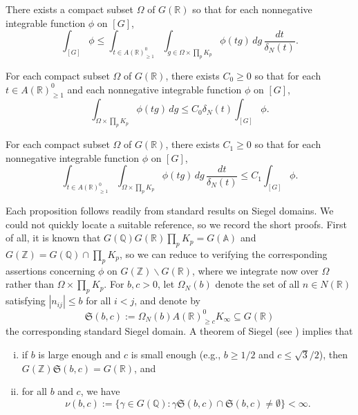 \begin{proposition}\label{prop:siegel-upper}
  There exists a compact subset $\Omega$ of $G(\mathbb{R})$ so that for each nonnegative integrable function $\phi$ on $[G]$,
  \begin{equation*}
    \int_{[G]} \phi \leq \int_{t \in A(\mathbb{R})_{\geq 1}^0} \int_{g \in \Omega \times \prod_p K_p} \phi(t g) \, d g \, \frac{d t}{\delta_N(t)}.
  \end{equation*}
\end{proposition}
\begin{proposition}\label{prop:siegel-lower}
  For each compact subset $\Omega$ of $G(\mathbb{R})$, there exists $C_0 \geq 0$ so that for each $t \in A(\mathbb{R})^0_{\geq 1}$ and each nonnegative integrable function $\phi$ on $[G]$,
  \begin{equation*}
    \int_{\Omega \times \prod_p K_p} \phi(t g) \, d g
    \leq C_0 \delta_N(t) \int_{[G]} \phi.
  \end{equation*}
\end{proposition}
\begin{proposition}\label{prop:siegel-lower-integrated}
  For each compact subset $\Omega$ of $G(\mathbb{R})$, there exists $C_1 \geq 0$ so that for each nonnegative integrable function $\phi$ on $[G]$,
  \begin{equation*}
    \int_{t \in A(\mathbb{R})_{\geq 1}^0} \int_{\Omega \times \prod_p K_p} \phi(t g) \, d g
    \, \frac{d t}{\delta_N(t)}
    \leq C_1 \int_{[G]} \phi.
  \end{equation*}
\end{proposition}
Each proposition follows readily from standard results on Siegel domains.  We could not quickly locate a suitable reference, so we record the short proofs.  First of all, it is known that $G(\mathbb{Q}) G(\mathbb{R}) \prod_p K_p = G(\mathbb{A})$ \cite[Prop 2.2]{MR202718} and $G(\mathbb{Z}) = G(\mathbb{Q}) \cap \prod_p K_p$, so we can reduce to verifying the corresponding assertions concerning $\phi$ on $G(\mathbb{Z}) \backslash G(\mathbb{R})$, where we integrate now over $\Omega$ rather than $\Omega \times \prod_p K_p$.  For $b, c > 0$, let $\Omega_N(b)$ denote the set of all $n \in N(\mathbb{R})$ satisfying $|n_{i j}| \leq b$ for all $i < j$, and denote by
\begin{equation*}
  \mathfrak{S}(b,c) := \Omega_N(b) A(\mathbb{R})^0_{\geq c} K_\infty  \subseteq G(\mathbb{R})
\end{equation*}
the corresponding standard Siegel domain.  A theorem of Siegel (see \cite[Prop 4.5]{MR147566}) implies that
\begin{enumerate}[(i)]
\item \label{itm:standard2:b-c-large-enough} if $b$ is large enough and $c$ is small enough (e.g., $b \geq 1/2$ and $c \leq \sqrt{3}/2$), then $G(\mathbb{Z}) \mathfrak{S}(b,c) = G(\mathbb{R})$, and
\item for all $b$ and $c$, we have
  \begin{equation}\label{eq:nubc}
    \nu(b,c) := \{\gamma \in G(\mathbb{Q}) : \gamma \mathfrak{S}(b,c) \cap \mathfrak{S}(b,c) \neq \emptyset \} < \infty.
  \end{equation}
\end{enumerate}

